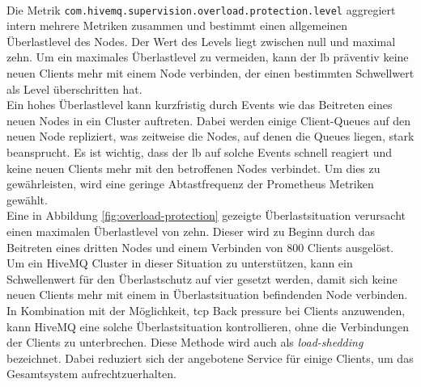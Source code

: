 \\
Die Metrik \verb|com.hivemq.supervision.overload.protection.level| aggregiert intern \newline mehrere Metriken zusammen und bestimmt einen allgemeinen Überlastlevel des Nodes.
Der Wert des Levels liegt zwischen null und maximal zehn.
Um ein maximales Überlastlevel zu vermeiden, kann der \acl{lb} präventiv keine neuen Clients mehr mit einem Node verbinden, der einen bestimmten Schwellwert als Level überschritten hat.
\\
Ein hohes Überlastlevel kann kurzfristig durch Events wie das Beitreten eines neuen Nodes in ein Cluster auftreten. Dabei werden einige Client-Queues auf den neuen Node repliziert, was zeitweise die Nodes, auf denen die Queues liegen, stark beansprucht. Es ist wichtig, dass der \ac{lb} auf solche Events schnell reagiert und keine neuen Clients mehr mit den betroffenen Nodes verbindet.
Um dies zu gewährleisten, wird eine geringe Abtastfrequenz der Prometheus Metriken gewählt.
\\
Eine in Abbildung \ref{fig:overload-protection} gezeigte Überlastsituation verursacht einen maximalen Überlastlevel von zehn. Dieser wird zu Beginn durch das Beitreten eines dritten Nodes und einem Verbinden von 800 Clients ausgelöst.
Um ein HiveMQ Cluster in dieser Situation zu unterstützen, kann ein Schwellenwert für den Überlastschutz auf vier gesetzt werden, damit sich keine neuen Clients mehr mit einem in Überlastsituation befindenden Node verbinden.
In Kombination mit der Möglichkeit, \ac{tcp} Back pressure bei Clients anzuwenden, kann HiveMQ eine solche Überlastsituation kontrollieren, ohne die Verbindungen der Clients zu unterbrechen.
Diese Methode wird auch als \textit{load-shedding} bezeichnet.
Dabei reduziert sich der angebotene Service für einige Clients, um das Gesamtsystem aufrechtzuerhalten.
\\
